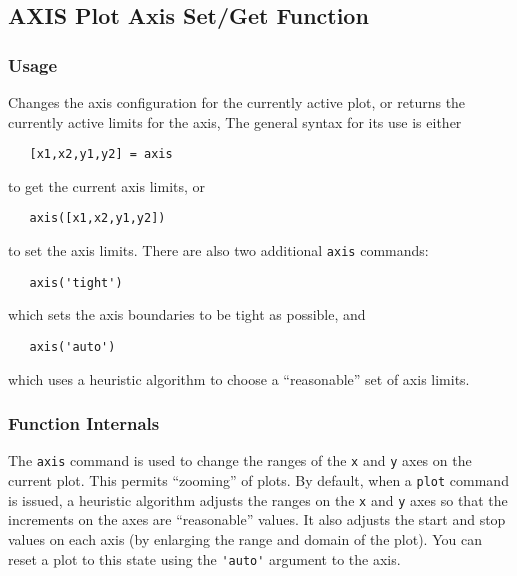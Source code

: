 %
%
%
\subsection{AXIS Plot Axis Set/Get Function}
\subsubsection{Usage}
Changes the axis configuration for the currently active plot,
or returns the currently active limits for the axis,  The
general syntax for its use is either
\begin{verbatim}
   [x1,x2,y1,y2] = axis
\end{verbatim}
to get the current axis limits, or
\begin{verbatim}
   axis([x1,x2,y1,y2])
\end{verbatim}
to set the axis limits.  There are also two additional \verb|axis|
commands:
\begin{verbatim}
   axis('tight')
\end{verbatim}
which sets the axis boundaries to be tight as possible, and
\begin{verbatim}
   axis('auto')
\end{verbatim}
which uses a heuristic algorithm to choose a ``reasonable'' set of
axis limits.
\subsubsection{Function Internals}
The \verb|axis| command is used to change the ranges of the \verb|x|
and \verb|y| axes on the current plot.  This permits ``zooming'' of
plots.  By default, when a \verb|plot| command is issued, a heuristic
algorithm adjusts the ranges on the \verb|x| and \verb|y| axes so that
the increments on the axes are ``reasonable'' values.  It also adjusts
the start and stop values on each axis (by enlarging the range and
domain of the plot).  You can reset a plot to this state using the 
\verb|'auto'| argument to the axis.  


